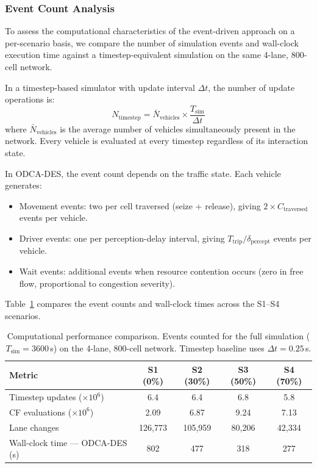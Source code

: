 \documentclass[review,authoryear]{elsarticle}
\begin{document}
\subsubsection{Event Count Analysis}
\label{sec:exp_event_count}

To assess the computational characteristics of the event-driven approach on a per-scenario basis, we compare the number of simulation events and wall-clock execution time against a timestep-equivalent simulation on the same 4-lane, 800-cell network.

In a timestep-based simulator with update interval $\Delta t$, the number of update operations is:
\begin{equation}
    N_{\text{timestep}} = \bar{N}_{\text{vehicles}} \times \frac{T_{\text{sim}}}{\Delta t}
    \label{eq:timestep_count}
\end{equation}
where $\bar{N}_{\text{vehicles}}$ is the average number of vehicles simultaneously present in the network. Every vehicle is evaluated at every timestep regardless of its interaction state.

In ODCA-DES, the event count depends on the traffic state. Each vehicle generates:
\begin{itemize}
    \item Movement events: two per cell traversed (seize + release), giving $2 \times C_{\text{traversed}}$ events per vehicle.
    \item Driver events: one per perception-delay interval, giving $T_{\text{trip}} / \delta_{\text{percept}}$ events per vehicle.
    \item Wait events: additional events when resource contention occurs (zero in free flow, proportional to congestion severity).
\end{itemize}

Table~\ref{tab:computational} compares the event counts and wall-clock times across the S1--S4 scenarios.

\begin{table}[ht]
\centering
\caption{Computational performance comparison. Events counted for the full simulation ($T_{\text{sim}} = 3600$\,s) on the 4-lane, 800-cell network. Timestep baseline uses $\Delta t = 0.25$\,s.}
\label{tab:computational}
\begin{tabular}{@{}lcccc@{}}
\toprule
Metric & S1 (0\%) & S2 (30\%) & S3 (50\%) & S4 (70\%) \\
\midrule
Timestep updates ($\times 10^6$) & 6.4 & 6.4 & 6.8 & 5.8 \\
CF evaluations ($\times 10^6$) & 2.09 & 6.87 & 9.24 & 7.13 \\
Lane changes & 126{,}773 & 105{,}959 & 80{,}206 & 42{,}334 \\
Wall-clock time --- ODCA-DES (s) & 802 & 477 & 318 & 277 \\
\bottomrule
\end{tabular}
\end{table}
\end{document}
